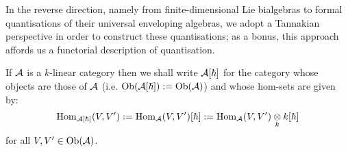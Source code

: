         In the reverse direction, namely from finite-dimensional Lie bialgebras to formal quantisations of their universal enveloping algebras, we adopt a Tannakian perspective in order to construct these quantisations; as a bonus, this approach affords us a functorial description of quantisation. 
        
        \begin{convention}
            If $\mathcal{A}$ is a $k$-linear category then we shall write $\mathcal{A}[\hbar]$ for the category whose objects are those of $\mathcal{A}$ (i.e. $\mathrm{Ob}(\mathcal{A}[\hbar]) := \mathrm{Ob}(\mathcal{A})$) and whose hom-sets are given by:
                $$\Hom_{\calA[\hbar]}(V, V') := \Hom_{\calA}(V, V')[\hbar] := \Hom_{\calA}(V, V') \tensor_k k[\hbar]$$
            for all $V, V' \in \mathrm{Ob}(\mathcal{A})$.
        \end{convention}
        
